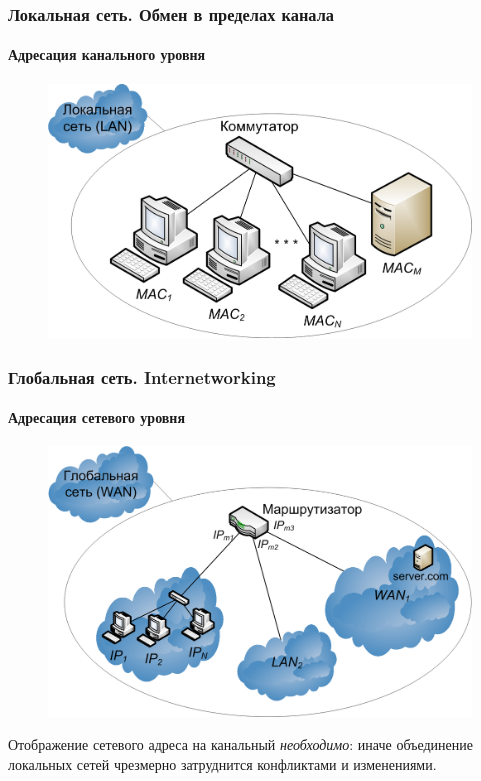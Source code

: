\begin{frame}
    \frametitle{Локальная сеть. Обмен в пределах канала}
    \framesubtitle{Адресация канального уровня}
    
    \begin{figure}
        \includegraphics[width=.9\textwidth]{fig/lan}\\
    \end{figure}
\end{frame}

\begin{frame}
    \frametitle{Глобальная сеть. \alert{Internet}working}
    \framesubtitle{Адресация сетевого уровня}
    
    \begin{figure}
        \includegraphics[width=.9\textwidth]{fig/wan}\\
    \end{figure}
\end{frame}

Отображение сетевого адреса на канальный \emph{необходимо}: иначе объединение локальных сетей чрезмерно затруднится конфликтами и изменениями.

